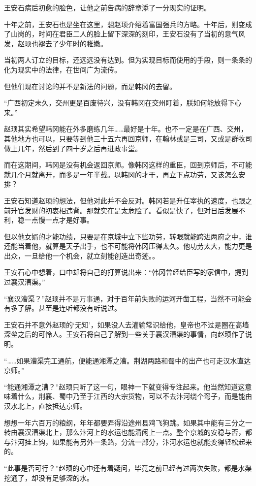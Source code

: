 王安石病后初愈的脸色，让他之前告病的辞章添了一分现实的证明。

十年之前，王安石也是坐在这里，想赵顼介绍着富国强兵的方略。十年后，则变成了山岗的，时间在君臣二人的脸上留下深深的刻印，王安石没有了当初的意气风发，赵顼也褪去了少年时的稚嫩。

当初两人订立的目标，还远远没有达到。但为实现目标而使用的手段，则一条条的化为现实中的法律，在世间广为流传。

但他们现在讨论的并不是新法的问题，而是韩冈的去留。

“广西初定未久，交州更是百废待兴，没有韩冈在交州盯着，朕如何能放得下心来。”

赵顼其实希望韩冈能在外多磨练几年……最好是十年。也不一定是在广西、交州，其他地方也可以，只要等到他三十五六再回京师，在翰林或是三司，又或是群牧司做上几年，然后到了四十岁之后再进政事堂。

而在这期间，韩冈是没有机会返回京师。像韩冈这样的重臣，回到京师后，不可能就几个月就离开，而多是一年半载。以韩冈的才干，再立下点功劳，又该怎么安排？

王安石知道赵顼的想法，但他对此并不会反对。韩冈若是升任宰执的速度，也跟之前升官发财的初衷相违背。那就实在是太危险了。看似是快了，但对日后发展不利，稳一点慢一点才是好事。

但以他女婿的才能功绩，只要是在京城中立下些功劳，转眼就能跨进两府之中，谁还能当着他，就算是天子出手，也不可能将韩冈压得太久。他功劳太大，能力更是出众，一旦给他一个机会，就立刻能创造出奇迹。。

王安石心中想着，口中却将自己的打算说出来：“韩冈曾经给臣写的家信中，提到过襄汉漕渠。”

“襄汉漕渠？”赵顼并不是万事通，对于百年前失败的运河开凿工程，当然不可能会有多了解。甚至是连听都没有听说过。

王安石并不意外赵顼的‘无知’，如果没人去灌输常识给他，皇帝也不过是圈在高墙深垒之后的可怜人。王安石将自己了解到一些关于襄汉漕渠的事情，向赵顼作了说明。

“……如果漕渠完工通航，便能通湘潭之漕。荆湖两路和蜀中的出产也可走汉水直达京师。”

“能通湘潭之漕？”赵顼只听了这一句，眼神一下就变得专注起来。他当然知道这意味着什么，荆襄、蜀中乃至于江西的大宗货物，可以不去汴河绕个弯子，而是能由汉水北上，直接抵达京师。

想想一年六百万的粮纲，年年都要弄得沿途州县鸡飞狗跳。如果其中能有三分之一转由襄汉漕渠北上，那么汴河上的水运也能清闲上一点。整个京城的安稳与否，都与汴河挂上钩，如果能有另外一条路，分流一部分，汴河水运也就能变得轻松起来的。

“此事是否可行？”赵顼的心中还有着疑问，毕竟之前已经有过两次失败，都是水渠挖通了，却没有足够深的水。


